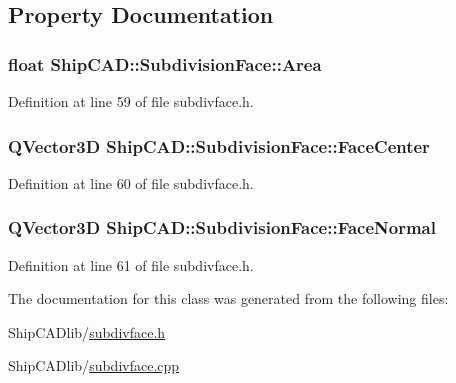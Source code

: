 \subsection{Property Documentation}
\hypertarget{classShipCAD_1_1SubdivisionFace_a88e0042b53b3830a523dfb782f3af6d5}{
\subsubsection[{Area}]{\setlength{\rightskip}{0pt plus 5cm}float Ship\-C\-A\-D\-::\-Subdivision\-Face\-::\-Area\hspace{0.3cm}{\ttfamily [read]}}}\label{classShipCAD_1_1SubdivisionFace_a88e0042b53b3830a523dfb782f3af6d5}


Definition at line 59 of file subdivface.\-h.

\hypertarget{classShipCAD_1_1SubdivisionFace_a8daac1b66fdaee14e3f8fb443106162e}{
\subsubsection[{Face\-Center}]{\setlength{\rightskip}{0pt plus 5cm}Q\-Vector3\-D Ship\-C\-A\-D\-::\-Subdivision\-Face\-::\-Face\-Center\hspace{0.3cm}{\ttfamily [read]}}}\label{classShipCAD_1_1SubdivisionFace_a8daac1b66fdaee14e3f8fb443106162e}


Definition at line 60 of file subdivface.\-h.

\hypertarget{classShipCAD_1_1SubdivisionFace_a44c07f86c9225ad2c463b259288fca94}{
\subsubsection[{Face\-Normal}]{\setlength{\rightskip}{0pt plus 5cm}Q\-Vector3\-D Ship\-C\-A\-D\-::\-Subdivision\-Face\-::\-Face\-Normal\hspace{0.3cm}{\ttfamily [read]}}}\label{classShipCAD_1_1SubdivisionFace_a44c07f86c9225ad2c463b259288fca94}


Definition at line 61 of file subdivface.\-h.



The documentation for this class was generated from the following files\-:\begin{DoxyCompactItemize}
\item 
Ship\-C\-A\-Dlib/\hyperlink{subdivface_8h}{subdivface.\-h}\item 
Ship\-C\-A\-Dlib/\hyperlink{subdivface_8cpp}{subdivface.\-cpp}\end{DoxyCompactItemize}
